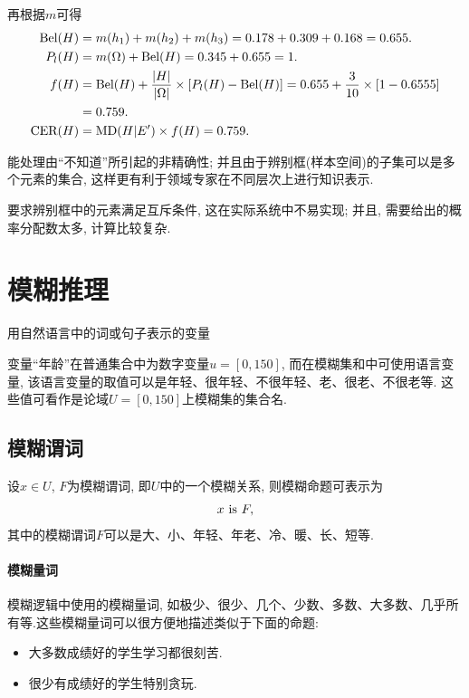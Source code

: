 再根据$m$可得
\begin{align*}
\textup{Bel}(H)&=m({h_1})+m({h_2})+m({h_3})=0.178+0.309+0.168=0.655.\\
  P_l(H)&=m(\Omega)+\textup{Bel}(H)=0.345+0.655=1.\\
  f(H) &=\textup{Bel}(H)+\frac{|H|}{|\Omega|} \times[P_l(H)-\textup{Bel}(H)]=0.655+\frac{3}{10} \times[1-0.6555] \\
       &=0.759.\\
  \textup{CER}(H)&=\textup{MD}(H|E')\times f(H)=0.759.
\end{align*}

\begin{tcolorbox}[title=\textbf{优点}]
    能处理由“不知道”所引起的非精确性; 并且由于辨别框(样本空间)的子集可以是多个元素的集合, 这样更有利于领域专家在不同层次上进行知识表示.
\end{tcolorbox}

\begin{tcolorbox}[title=\textbf{缺点}]
    要求辨别框中的元素满足互斥条件, 这在实际系统中不易实现; 并且, 需要给出的概率分配数太多, 计算比较复杂.
\end{tcolorbox}
\section{模糊推理}
用自然语言中的词或句子表示的变量
\begin{example}
变量“年龄”在普通集合中为数字变量$u=[0, 150]$, 而在模糊集和中可使用语言变量, 该语言变量的取值可以是年轻、很年轻、不很年轻、老、很老、不很老等. 这些值可看作是论域$U=[0, 150]$上模糊集的集合名.
\end{example}
\subsection{模糊谓词}
设$x\in U$, $F$为模糊谓词, 即$U$中的一个模糊关系, 则模糊命题可表示为
 \begin{align}
        x\,\,  \textup{is} \,\, F,
 \end{align}
其中的模糊谓词$F$可以是大、小、年轻、年老、冷、暖、长、短等.
\paragraph{模糊量词}
模糊逻辑中使用的模糊量词, 如极少、很少、几个、少数、多数、大多数、几乎所有等.这些模糊量词可以很方便地描述类似于下面的命题:
\begin{itemize}
\item 大多数成绩好的学生学习都很刻苦.
\item 很少有成绩好的学生特别贪玩.
\end{itemize}

